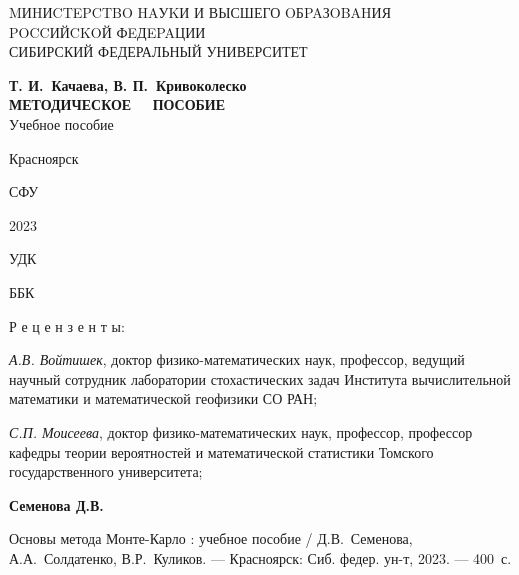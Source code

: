 \thispagestyle{empty}
\begin{center}

MИHИCTEPCTBO HAУKИ И ВЫСШЕГО OБPAЗOBAHИЯ\\[6pt]
 
POCCИЙCKOЙ  ФEДEPAЦИИ\\[15pt]

{\large
  СИБИРСКИЙ ФЕДЕРАЛЬНЫЙ УНИВЕРСИТЕТ
}

\vfill

{\LARGE
\textbf{Т. И.~Качаева, В. П.~Кривоколеско}}\\[35pt]


{\LARGE
{\bf МЕТОДИЧЕСКОЕ \ \ ПОСОБИЕ} \\[25pt]

Учебное пособие 
}

\vfill


{\Large
Красноярск

СФУ

2023}
\end{center}

\newpage
\thispagestyle{empty}

УДК %

ББК %

\vspace{2cm}

Р е ц е н з е н т ы:

{\it А.\;В. Войтишек}, доктор \! физико-математических \! наук, \! профессор, ведущий \! научный  \! сотрудник  \! лаборатории  \! стохастических  \! задач  \! Института  \! вычислительной  \! математики  \! и   \! математической  \! геофизики  \! СО  \! РАН;

{\it С.\;П. Моисеева}, доктор \! физико-математических \! наук,  \! профессор, \! профессор \! кафедры \!
теории \! вероятностей и математической \! статистики \! Томского \! государственного \! университета;

\medskip



\vspace{2cm}

\textbf{Семенова Д.В.}

Основы метода Монте-Карло : учебное пособие /  Д.\;В.~Семенова, А.\;А.~Солдатенко, В.\;Р.~Куликов. --- Красноярск: Сиб. федер. ун-т, 2023. --- 400~с.




